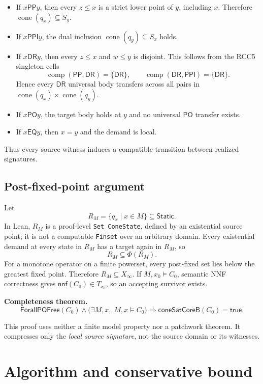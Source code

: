 \documentclass[11pt]{article}
\newcommand{\PP}{\mathsf{PP}}
\newcommand{\PPI}{\mathsf{PPI}}
\newcommand{\PO}{\mathsf{PO}}
\newcommand{\DR}{\mathsf{DR}}
\newcommand{\EQ}{\mathsf{EQ}}
\newcommand{\cone}{\operatorname{cone}}
\newcommand{\Phiop}{\Phi}
\begin{document}
\begin{itemize}
  \item If $x\PP y$, then every $z\leq x$ is a strict lower point of $y$, including $x$.
        Therefore $\cone(q_x)\subseteq S_y$.
  \item If $x\PPI y$, the dual inclusion $\cone(q_y)\subseteq S_x$ holds.
  \item If $x\DR y$, then every $z\leq x$ and $w\leq y$ is disjoint. This follows from
        the RCC5 singleton cells
        \[
          \operatorname{comp}(\PP,\DR)=\{\DR\},
          \qquad
          \operatorname{comp}(\DR,\PPI)=\{\DR\}.
        \]
        Hence every $\DR$ universal body transfers across all pairs in
        $\cone(q_x)\times\cone(q_y)$.
  \item If $x\PO y$, the target body holds at $y$ and no universal $\PO$ transfer exists.
  \item If $x\EQ y$, then $x=y$ and the demand is local.
\end{itemize}

Thus every source witness induces a compatible transition between realized signatures.

\subsection{Post-fixed-point argument}

Let
\[
  R_M=\{q_x\mid x\in M\}\subseteq\mathsf{Static}.
\]
In Lean, $R_M$ is a proof-level \texttt{Set ConeState}, defined by an existential source
point; it is not a computable \texttt{Finset} over an arbitrary domain.
Every existential demand at every state in $R_M$ has a target again in $R_M$, so
\[
  R_M\subseteq\Phiop(R_M).
\]
For a monotone operator on a finite powerset, every post-fixed set lies below the greatest
fixed point. Therefore $R_M\subseteq X_\infty$. If $M,x_0\models C_0$, semantic NNF
correctness gives $\mathsf{nnf}(C_0)\in T_{x_0}$, so an accepting survivor exists.

\textbf{Completeness theorem.}
\[
  \mathsf{ForallPOFree}(C_0)\wedge
  \bigl(\exists M,x,\;M,x\models C_0\bigr)
  \Longrightarrow \mathsf{coneSatCoreB}(C_0)=\mathsf{true}.
\]

This proof uses neither a finite model property nor a patchwork theorem. It compresses
only the \emph{local source signature}, not the source domain or its witnesses.

\section{Algorithm and conservative bound}
\end{document}
